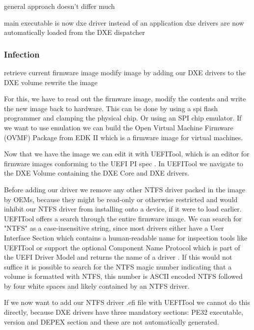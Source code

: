 general approach doesn't differ much

main executable is now dxe driver instead of an application
dxe drivers are now automatically loaded from the DXE dispatcher

\subsubsection{Infection}

retrieve current firmware image
modify image by adding our DXE drivers to the DXE volume
rewrite the image

For this, we have to read out the firmware image, modify the contents and write the new image back to hardware. This can be done by using a spi flash programmer and clamping the physical chip. Or using an SPI chip emulator. 
If we want to use emulation we can build the Open Virtual Machine Firmware (OVMF) Package from EDK II which is a firmware image for virtual machines.

Now that we have the image we can edit it with UEFITool, which is an editor for firmware images conforming to the UEFI PI spec \cite{uefitool}.
In UEFITool we navigate to the DXE Volume containing the DXE Core and DXE drivers.

Before adding our driver we remove any other NTFS driver packed in the image by OEMs, because they might be read-only or otherwise restricted and would inhibit our NTFS driver from installing onto a device, if it were to load earlier. UEFITool offers a search through the entire firmware image. We can search for "NTFS" as a case-insensitive string, since most drivers either have a User Interface Section which contains a human-readable name for inspection tools like UEFITool \cite[Vol 3, 3.2.5]{pi-spec} or support the optional Component Name Protocol which is part of the UEFI Driver Model and returns the name of a driver \cite[11.5]{uefi-spec}. If this would not suffice it is possible to search for the NTFS magic number indicating that a volume is formatted with NTFS, this number is ASCII encoded NTFS followed by four white spaces and likely contained by an NTFS driver.

If we now want to add our NTFS driver .efi file with UEFITool we cannot do this directly, because DXE drivers have three mandatory sections: PE32 executable, version and DEPEX section \cite[Vol 3, 2.1.4.1.4]{pi-spec} and these are not automatically generated.

